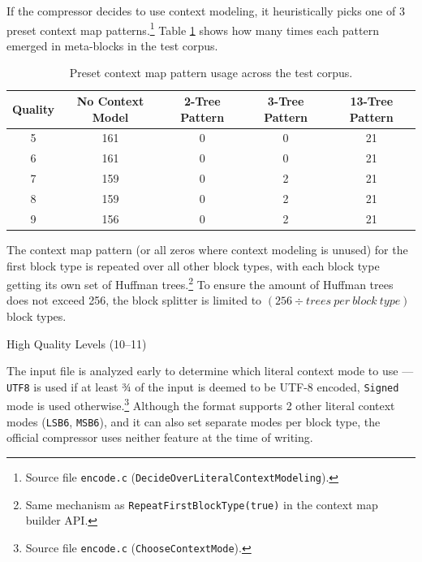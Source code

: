 \documentclass[english,master,dept460,male,cpp,cpdeclaration]{diploma}
\makeatletter
\renewcommand\paragraph
	{\@startsection{paragraph}{4}{\z@}
	{-3.25ex plus 1ex minus .2ex}
	{1.5ex plus .2ex}
	{\normalfont\normalsize\bfseries}}
\newcommand{\subfoursection}[1]{\paragraph{#1}}
\makeatother
\begin{document}
			If the compressor decides to use context modeling, it heuristically picks one of 3 preset context map patterns.\footnote{Source file \texttt{encode.c} (\texttt{DecideOverLiteralContextModeling}).} Table \ref{table:preset-context-map-use-counts} shows how many times each pattern emerged in meta-blocks in the test corpus.
			
			\begin{table}[H]
				\centering
				\caption{Preset context map pattern usage across the test corpus.}
				\label{table:preset-context-map-use-counts}
				
				\begin{tabular}{c|c|c|c|c}
					Quality & No Context Model & 2-Tree Pattern & 3-Tree Pattern & 13-Tree Pattern \\ \hline
					   5    &       161        &       0        &       0        &       21        \\
					   6    &       161        &       0        &       0        &       21        \\
					   7    &       159        &       0        &       2        &       21        \\
					   8    &       159        &       0        &       2        &       21        \\
					   9    &       156        &       0        &       2        &       21
				\end{tabular}
			\end{table}
			
			\noindent
			The context map pattern (or all zeros where context modeling is unused) for the first block type is repeated over all other block types, with each block type getting its own set of Huffman trees.\footnote{Same mechanism as \texttt{RepeatFirstBlockType(true)} in the context map builder API.} To ensure the amount of Huffman trees does not exceed 256, the block splitter is limited to $(256 \div trees\ per\ block\ type)$ block types.
			
			\subfoursection{High Quality Levels (10--11)}
			
			The input file is analyzed early to determine which literal context mode to use --- \verb|UTF8| is used if at least ¾ of the input is deemed to be UTF-8 encoded, \verb|Signed| mode is used otherwise.\footnote{Source file \texttt{encode.c} (\texttt{ChooseContextMode}).} Although the format supports 2 other literal context modes (\verb|LSB6|, \verb|MSB6|), and it can also set separate modes per block type, the official compressor uses neither feature at the time of writing.
			
\end{document}
